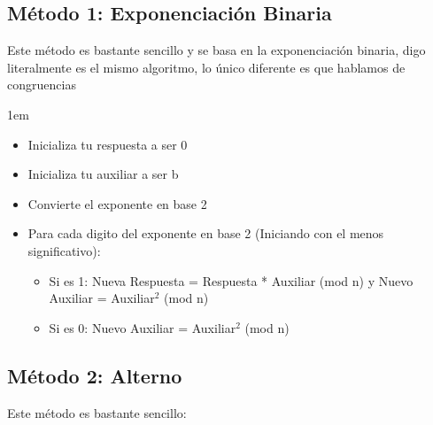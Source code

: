 \documentclass[12pt, fleqn]{report}                             %
\newenvironment{SmallIndentation}[1][0.75em]                    %
    {\begin{adjustwidth}{#1}{}\begin{footnotesize}}                 %
    {\end{footnotesize}\end{adjustwidth}}                           %
\begin{document}
        \subsection*{Método 1: Exponenciación Binaria}

            Este método es bastante sencillo y se basa en la exponenciación binaria, digo
            literalmente es el mismo algoritmo, lo único diferente es que hablamos de congruencias

            \begin{SmallIndentation}[1em]
                
                \begin{itemize}
                    \item   Inicializa tu respuesta a ser 0
                    \item   Inicializa tu auxiliar a ser b
                    \item   Convierte el exponente en base 2

                    \item Para cada digito del exponente en base 2 (Iniciando con
                          el menos significativo):
                        
                        \begin{itemize}
                            \item Si es 1:
                                    Nueva Respuesta = Respuesta * Auxiliar (mod n) y Nuevo Auxiliar = Auxiliar$^2$ (mod n)
                            \item Si es 0:
                                    Nuevo Auxiliar = Auxiliar$^2$ (mod n)
                        \end{itemize}
                \end{itemize}

            \end{SmallIndentation}


        \clearpage
        \subsection*{Método 2: Alterno}

            Este método es bastante sencillo:
\end{document}
